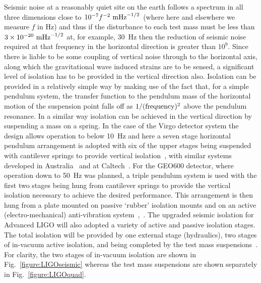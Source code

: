 \documentclass{article}
\begin{document}
Seismic noise at a reasonably quiet site on the earth follows a spectrum in all
three dimensions close to $10^{-7}f^{-2}~{\rm m}{\rm Hz}^{-1/2}$ (where here
and elsewhere we measure $f$ in Hz) and thus if the disturbance to each test
mass must be less than $3 \times 10^{-20}~{\rm m}{\rm Hz}^{-1/2}$ at, for
example, 30~Hz then the reduction of seismic noise required at that frequency in
the horizontal direction is greater than $10^{9}$. Since there is liable to be
some coupling of vertical noise through to the horizontal axis, along which the
gravitational wave induced strains are to be sensed, a significant level of
isolation has to be provided in the vertical direction also. Isolation can be
provided in a relatively simple way by making use of the fact that, for a simple
pendulum system, the transfer function to the pendulum mass of the horizontal
motion of the suspension point falls off as $1/({\rm frequency})^2$ above the
pendulum resonance. In a similar way isolation can be achieved in the vertical
direction by suspending a mass on a spring. In the case of the Virgo detector
system the design allows operation to below 10~Hz and here a seven stage
horizontal pendulum arrangement is adopted with six of the upper stages being
suspended with cantilever springs to provide vertical isolation~\cite{Braccini},
with similar systems developed in Australia~\cite{Ju1} and at
Caltech~\cite{DeSalvo}. For the GEO600 detector, where operation down to 50~Hz
was planned, a triple pendulum system is used with the first two stages being
hung from cantilever springs to provide the vertical isolation necessary to
achieve the desired performance. This arrangement is then hung from a plate
mounted on passive `rubber' isolation mounts and on an active
(electro-mechanical) anti-vibration system~\cite{Plissi1},~\cite{Torrie}. The
upgraded seismic isolation for Advanced LIGO will also adopted a variety of
active and passive isolation stages. The total isolation will be provided by one
external stage (hydraulics), two stages of in-vacuum active isolation, and being
completed by the test mass suspensions~\cite{Abbott:2002, Harry:2010}. For
clarity, the two stages of in-vacuum isolation are shown in
Fig.~\ref{figure:LIGOseismic} whereas the test mass suspensions are shown
separately in Fig.~\ref{figure:LIGOquad}.

\end{document}
